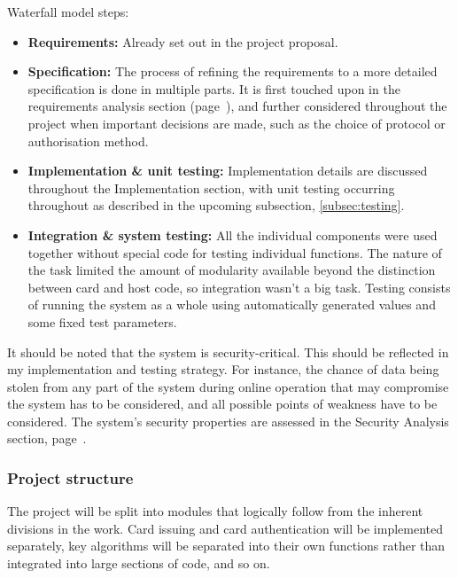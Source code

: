 \documentclass[12pt,a4paper]{article}
\begin{document}
Waterfall model steps:
\begin{itemize}
	\item \textbf{Requirements:} Already set out in the project proposal. 
	
	\item \textbf{Specification:} The process of refining the requirements to a more detailed specification is done in multiple parts. It is first touched upon in the requirements analysis section (page~\pageref{sec:requirements}), and further considered throughout the project when important decisions are made, such as the choice of protocol or authorisation method. %
	
	\item \textbf{Implementation \& unit testing:} Implementation details are discussed throughout the Implementation section, with unit testing occurring throughout as described in the upcoming subsection, \ref{subsec:testing}.
	
	\item \textbf{Integration \& system testing:} All the individual components were used together without special code for testing individual functions. The nature of the task limited the amount of modularity available beyond the distinction between card and host code, so integration wasn't a big task. Testing consists of running the system as a whole using automatically generated values and some fixed test parameters.
\end{itemize}

It should be noted that the system is security-critical. This should be reflected in my implementation and testing strategy. For instance, the chance of data being stolen from any part of the system during online operation that may compromise the system has to be considered, and all possible points of weakness have to be considered. The system's security properties are assessed in the Security Analysis section, page~\pageref{sec:security_analysis}.

\subsubsection{Project structure}
The project will be split into modules that logically follow from the inherent divisions in the work. Card issuing and card authentication will be implemented separately, key algorithms will be separated into their own functions rather than integrated into large sections of code, and so on. 
\end{document}

